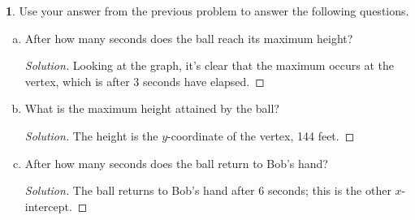 \documentclass[12pt]{amsart}
\theoremstyle{definition}
\newtheorem{thm}{}
\begin{document}
\begin{thm}\label{problem: maximum}
  Use your answer from the previous problem to answer the following questions.
  \begin{enumerate}[(a)]
  \item
    After how many seconds does the ball reach its maximum height?
    \begin{proof}[Solution]
      Looking at the graph, it's clear that the maximum occurs at the vertex, which is after 3 seconds have elapsed.
    \end{proof}
  \item
    What is the maximum height attained by the ball?
    \begin{proof}[Solution]
      The height is the $y$-coordinate of the vertex, 144 feet.
    \end{proof}
  \item
    After how many seconds does the ball return to Bob's hand?
    \begin{proof}[Solution]
      The ball returns to Bob's hand after 6 seconds; this is the other $x$-intercept.
    \end{proof}
  \end{enumerate}
\end{thm}
\end{document}
